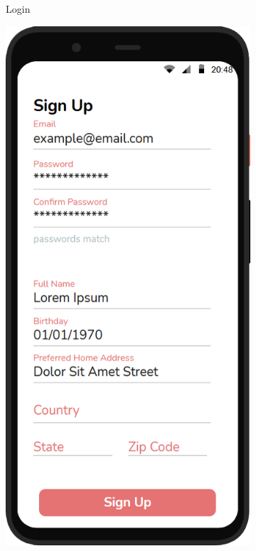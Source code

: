 \begin{figure}[H]
\begin{subfigure}{.33\textwidth}
        \caption{Login}
        \label{fig:screen1}
    \end{subfigure}%
    \begin{subfigure}{.33\textwidth}
        \centering
        \includegraphics[width=.95\linewidth]{Images/screen_02.png}

\end{subfigure}
\end{figure}
